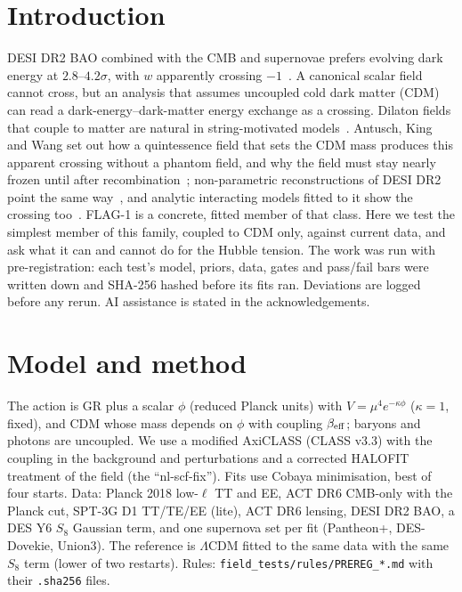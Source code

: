\documentclass[11pt]{article}
\begin{document}
\section{Introduction}
DESI DR2 BAO combined with the CMB and supernovae prefers evolving dark energy at $2.8$--$4.2\sigma$, with $w$
apparently crossing $-1$~\cite{desi2025}. A canonical scalar field cannot cross, but an analysis that assumes
uncoupled cold dark matter (CDM) can read a dark-energy--dark-matter energy exchange as a crossing. Dilaton fields that
couple to matter are natural in string-motivated models~\cite{damour1994,smith2025}. Antusch, King and Wang set out how a
quintessence field that sets the CDM mass produces this apparent crossing without a phantom field, and why the field
must stay nearly frozen until after recombination~\cite{antusch2026}; non-parametric reconstructions of DESI DR2 point
the same way~\cite{you2025}, and analytic interacting models fitted to it show the crossing too~\cite{figueruelo2026}.
FLAG-1 is a concrete, fitted member of that class. Here we test the simplest member of
this family, coupled to CDM only, against current data, and ask what it can and cannot do for the Hubble tension. The
work was run with pre-registration: each test's model, priors, data, gates and pass/fail bars were written down and
SHA-256 hashed before its fits ran. Deviations are logged before any rerun. AI assistance is stated in the
acknowledgements.

\section{Model and method}
The action is GR plus a scalar $\phi$ (reduced Planck units) with $V=\mu^4 e^{-\kappa\phi}$ ($\kappa=1$, fixed), and CDM
whose mass depends on $\phi$ with coupling $\beta_{\rm eff}$; baryons and photons are uncoupled. We use a modified
AxiCLASS (CLASS v3.3) with the coupling in the background and perturbations and a corrected HALOFIT treatment of the
field (the ``nl-scf-fix''). Fits use Cobaya minimisation, best of four starts. Data: Planck 2018 low-$\ell$ TT and EE,
ACT DR6 CMB-only with the Planck cut, SPT-3G D1 TT/TE/EE (lite), ACT DR6 lensing, DESI DR2 BAO, a DES Y6 $S_8$ Gaussian
term, and one supernova set per fit (Pantheon+, DES-Dovekie, Union3). The reference is $\Lambda$CDM fitted to the same
data with the same $S_8$ term (lower of two restarts). Rules: \texttt{field\_tests/rules/PREREG\_*.md} with their
\texttt{.sha256} files.
\end{document}
